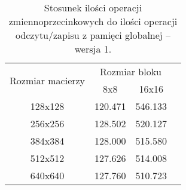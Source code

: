 \begin{table}[H]
\centering
\begin{tabular}{|c|c|c|c|}
\hline
\multirow{2}{*}{Rozmiar macierzy} & \multicolumn{2}{c|}{Rozmiar bloku} \\ \cline{2-3}
& 8x8 & 16x16 \\ \hline
128x128 & 120.471 & 546.133 \\ \hline
256x256 & 128.502 & 520.127 \\ \hline
384x384 & 128.000 & 515.580 \\ \hline
512x512 & 127.626 & 514.008 \\ \hline
640x640 & 127.760 & 510.723 \\ \hline
\end{tabular}
\caption{Stosunek ilości operacji zmiennoprzecinkowych do ilości operacji odczytu/zapisu z pamięci globalnej -- wersja 1.}
\end{table}

